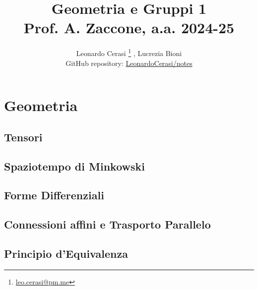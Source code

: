 \documentclass[a4paper, 12pt, openany]{book}
\author{Leonardo Cerasi%
	\thanks{\scriptsize\href{mailto:leonardo.cerasi@studenti.unimi.it}{leo.cerasi@pm.me}}%
	, Lucrezia Bioni\\
	\small GitHub repository: \href{https://github.com/LeonardoCerasi/notes}{LeonardoCerasi/notes}}
\title{\Huge\textbf{Geometria e Gruppi 1} \\ \large Prof. A. Zaccone, a.a. 2024-25}
\begin{document}
\frontmatter

\maketitle
\tableofcontents

\mainmatter

\part{Geometria}

\chapter{Tensori}


\chapter{Spaziotempo di Minkowski}


\chapter{Forme Differenziali}


\chapter{Connessioni affini e Trasporto Parallelo}


\chapter{Principio d'Equivalenza}

\end{document}

